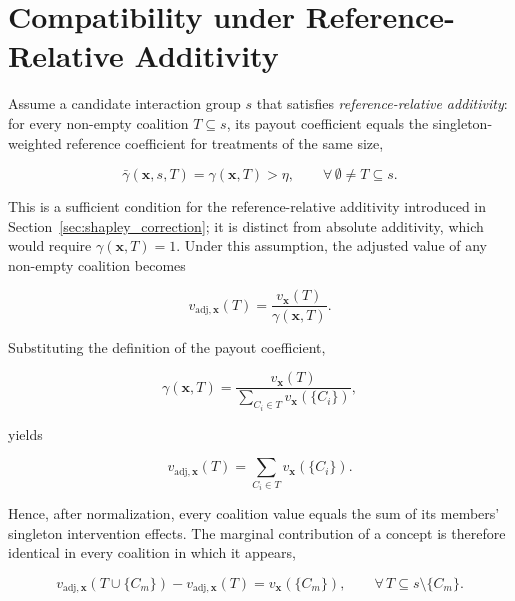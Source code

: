 \section*{Compatibility under Reference-Relative Additivity}
\begin{math_box}[label=ma:independence_behavior]
    Assume a candidate interaction group $s$ that satisfies \emph{reference-relative
    additivity}: for every non-empty coalition $T\subseteq s$, its payout
    coefficient equals the singleton-weighted reference coefficient for treatments
    of the same size,

    \begin{equation}
        \bar\gamma(\mathbf{x},s,T)=\gamma(\mathbf{x},T)>\eta,
        \qquad \forall\,\emptyset\neq T\subseteq s.
    \end{equation}

    This is a sufficient condition for the reference-relative additivity
    introduced in Section~\ref{sec:shapley_correction}; it is distinct from
    absolute additivity, which would require $\gamma(\mathbf{x},T)=1$. Under this
    assumption, the adjusted value of any non-empty coalition becomes

    \begin{equation}
        v_{\mathrm{adj},\mathbf{x}}(T)
        =
        \frac{v_{\mathbf{x}}(T)}
        {\gamma(\mathbf{x},T)}.
    \end{equation}

    Substituting the definition of the payout coefficient,

    \begin{equation}
        \gamma(\mathbf{x},T)
        =
        \frac{v_{\mathbf{x}}(T)}
        {\sum_{C_i\in T}v_{\mathbf{x}}(\{C_i\})},
    \end{equation}

    yields

    \begin{equation}
        v_{\mathrm{adj},\mathbf{x}}(T)
        =
        \sum_{C_i\in T}v_{\mathbf{x}}(\{C_i\}).
    \end{equation}

    Hence, after normalization, every coalition value equals the sum of its
    members' singleton intervention effects. The marginal contribution of a concept
    is therefore identical in every coalition in which it appears,

    \begin{equation}
        v_{\mathrm{adj},\mathbf{x}}(T\cup\{C_m\})
        -
        v_{\mathrm{adj},\mathbf{x}}(T)
        =
        v_{\mathbf{x}}(\{C_m\}),
        \qquad
        \forall\,T\subseteq s\setminus\{C_m\}.
    \end{equation}


\end{math_box}
